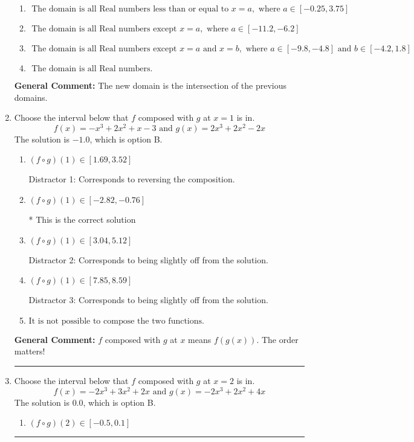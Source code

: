 \documentclass{extbook}[14pt]
\newcommand{\litem}[1]{\item #1

\rule{\textwidth}{0.4pt}}
\begin{document}
\begin{enumerate}
{\begin{enumerate}[label=\Alph*.]
\item \( \text{ The domain is all Real numbers less than or equal to } x = a, \text{ where } a \in [-0.25, 3.75] \)


\item \( \text{ The domain is all Real numbers except } x = a, \text{ where } a \in [-11.2, -6.2] \)


\item \( \text{ The domain is all Real numbers except } x = a \text{ and } x = b, \text{ where } a \in [-9.8, -4.8] \text{ and } b \in [-4.2, 1.8] \)


\item \( \text{ The domain is all Real numbers. } \)


\end{enumerate}

\textbf{General Comment:} The new domain is the intersection of the previous domains.
}
\litem{
Choose the interval below that $f$ composed with $g$ at $x=1$ is in.
\[ f(x) = -x^{3} +2 x^{2} +x -3 \text{ and } g(x) = 2x^{3} +2 x^{2} -2 x \]The solution is \( -1.0 \), which is option B.\begin{enumerate}[label=\Alph*.]
\item \( (f \circ g)(1) \in [1.69, 3.52] \)

 Distractor 1: Corresponds to reversing the composition.
\item \( (f \circ g)(1) \in [-2.82, -0.76] \)

* This is the correct solution
\item \( (f \circ g)(1) \in [3.04, 5.12] \)

 Distractor 2: Corresponds to being slightly off from the solution.
\item \( (f \circ g)(1) \in [7.85, 8.59] \)

 Distractor 3: Corresponds to being slightly off from the solution.
\item \( \text{It is not possible to compose the two functions.} \)


\end{enumerate}

\textbf{General Comment:} $f$ composed with $g$ at $x$ means $f(g(x))$. The order matters!
}
\litem{
Choose the interval below that $f$ composed with $g$ at $x=2$ is in.
\[ f(x) = -2x^{3} +3 x^{2} +2 x \text{ and } g(x) = -2x^{3} +2 x^{2} +4 x \]The solution is \( 0.0 \), which is option B.\begin{enumerate}[label=\Alph*.]
\item \( (f \circ g)(2) \in [-0.5, 0.1] \)


\end{enumerate}}
\end{enumerate}
\end{document}

